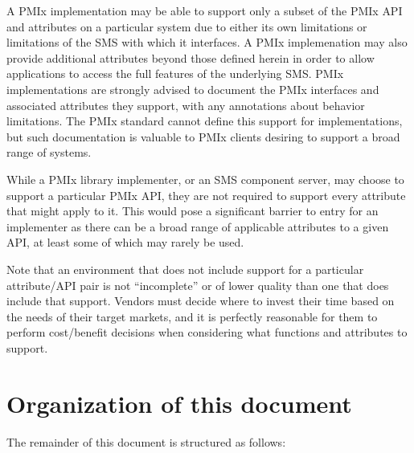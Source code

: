 A \ac{PMIx} implementation may be able to support only a subset of the \ac{PMIx} \acs{API} and attributes on
a particular system due to either its own limitations or limitations of the \ac{SMS} with which it interfaces.
A \ac{PMIx} implemenation may also provide additional attributes beyond those defined herein in order to allow
applications to access the full features of the underlying \ac{SMS}.
\ac{PMIx} implementations are strongly advised to document the \ac{PMIx} interfaces and associated attributes they support, with any annotations about behavior limitations.
The \ac{PMIx} standard cannot define this support for implementations, but such documentation is valuable to \ac{PMIx} clients desiring to support a broad range of systems.

While a \ac{PMIx} library implementer, or an \ac{SMS} component server, may choose to support a particular \ac{PMIx} \ac{API}, they are not required to support every attribute that might apply to it. This would pose a significant barrier to entry for an implementer as there can be a broad range of applicable attributes to a given \ac{API}, at least some of which may rarely be used.

Note that an environment that does not include support for a particular attribute/\ac{API} pair is not ``incomplete'' or of lower quality than one that does include that support. Vendors must decide where to invest their time based on the needs of their target markets, and it is perfectly reasonable for them to perform cost/benefit decisions when considering what functions and attributes to support.

\section{Organization of this document}

The remainder of this document is structured as follows:


